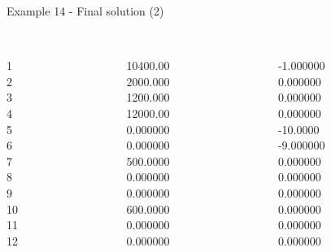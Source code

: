 \begin{frame}{Example 14 - Final solution (2)}
\footnotesize
\begin{columns}[t]
\begin{column}{0.3\textwidth}
\\
1\\
2\\
3\\
4\\
5\\
6\\
7\\
8\\
9\\
10\\
11\\
12\\

\end{column}
\begin{column}{0.3\textwidth}
\\
10400.00\\
2000.000\\
1200.000\\
12000.00\\
0.000000\\
0.000000\\
500.0000\\
0.000000\\
0.000000\\
600.0000\\
0.000000\\
0.000000\\

\end{column}

\begin{column}{0.3\textwidth}
\\
-1.000000\\
0.000000\\
0.000000\\
0.000000\\
-10.0000\\
-9.000000\\
0.000000\\
0.000000\\
0.000000\\
0.000000\\
0.000000\\
0.000000\\
\end{column}
\end{columns}
\end{frame}

